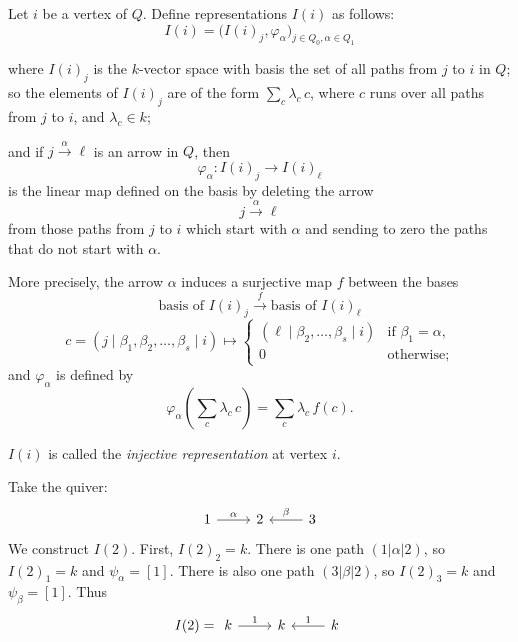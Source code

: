 \documentclass[11pt, a4paper]{report}
\begin{document}
\begin{definition}
    Let $i$ be a vertex of $Q$. Define representations $I(i)$
    as follows:
    \[
        I(i)=\bigl(I(i)_j,\varphi_\alpha\bigr)_{j\in Q_0,\alpha\in Q_1}
    \]

    where $I(i)_j$ is the $k$-vector space with basis the set of all paths from $j$ to $i$ in
    $Q$; so the elements of $I(i)_j$ are of the form $\sum_c \lambda_c\, c$, where $c$ runs
    over all paths from $j$ to $i$, and $\lambda_c\in k$;

    and if $j \xrightarrow{\alpha} \ell$ is an arrow in $Q$, then
    \[
        \varphi_\alpha : I(i)_j \to I(i)_\ell
    \]
    is the linear map defined on the basis by deleting the arrow
    \[
        j \xrightarrow{\alpha} \ell
    \]
    from those paths from $j$ to $i$ which start with $\alpha$ and sending to zero the
    paths that do not start with $\alpha$.

    More precisely, the arrow $\alpha$ induces a surjective map $f$ between the bases
    \[
        \text{basis of } I(i)_j \xrightarrow{\;f\;} \text{basis of } I(i)_\ell
    \]
    \[
        c=(j\mid \beta_1,\beta_2,\ldots,\beta_s\mid i)\longmapsto
        \begin{cases}
            (\ell\mid \beta_2,\ldots,\beta_s\mid i) & \text{if } \beta_1=\alpha, \\
            0                                       & \text{otherwise};
        \end{cases}
    \]
    and $\varphi_\alpha$ is defined by
    \[
        \varphi_\alpha\left(\sum_c \lambda_c\, c\right)=\sum_c \lambda_c\, f(c).
    \]

    $I(i)$ is called the \emph{injective representation} at vertex $i$.
\end{definition}

\begin{example}
    Take the quiver:
    \[
        \begin{tikzcd}
            1 \arrow[r, "\alpha"] & 2 & 3 \arrow[l, "\beta"']
        \end{tikzcd}
    \]
    We construct $I(2)$. First, $I(2)_2=k$. There is one path $(1|\alpha|2)$, so $I(2)_1=k$ and $\psi_\alpha=[1]$. There is also one path $(3|\beta|2)$, so $I(2)_3=k$ and $\psi_\beta=[1]$. Thus
    \[
        I(2)= \begin{tikzcd}
            k \arrow[r, "1"] & k  & k \arrow[l, "1"']
        \end{tikzcd}
    \]
\end{example}
\end{document}
